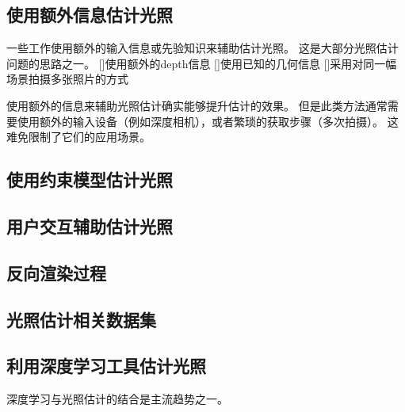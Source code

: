\subsection{使用额外信息估计光照}
一些工作使用额外的输入信息或先验知识来辅助估计光照。
这是大部分光照估计问题的思路之一。
[]使用额外的depth信息
[]使用已知的几何信息
[]采用对同一幅场景拍摄多张照片的方式

使用额外的信息来辅助光照估计确实能够提升估计的效果。
但是此类方法通常需要使用额外的输入设备（例如深度相机），或者繁琐的获取步骤（多次拍摄）。
这难免限制了它们的应用场景。

\subsection{使用约束模型估计光照}
\subsection{用户交互辅助估计光照}
\subsection{反向渲染过程}

\subsection{光照估计相关数据集}
\subsection{利用深度学习工具估计光照}

深度学习与光照估计的结合是主流趋势之一。